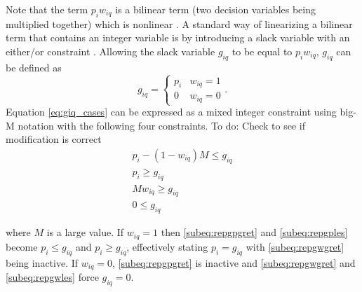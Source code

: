 \documentclass[letterpaper, 10pt, conference]{IEEEtran}
\newcommand{\TODO}[1]{{\color{green} To do: #1}}                                %
\begin{document}
Note that the term $p_i w_{iq}$ is a bilinear term (two decision variables being multiplied together) which is nonlinear
\cite{Rodriguez2013}. A standard way of linearizing a bilinear term that contains an integer variable is by introducing a slack variable with an either/or constraint \cite{Chen2010,Rodriguez2013}. Allowing
the slack variable $g_{iq}$ to be equal to $p_i w_{iq}$, $g_{iq}$ can be defined as
\begin{equation}
    \label{eq:giq_cases}
    g_{iq} =
    \begin{cases}
        p_i & w_{iq} = 1 \\
        0 & w_{iq} = 0
    \end{cases}.
\end{equation}
Equation \eqref{eq:giq_cases} can be expressed as a mixed integer constraint using big-M notation with the following four constraints. \TODO{Check to see if modification is correct}
\begin{subequations}
    \label{eq:slack_gain}
\begin{align}
    p_i - (1 - w_{iq})M \leq g_{iq}  \label{subeq:repgpgret} \\
    p_i \geq g_{iq}                 \label{subeq:repgples} \\
    Mw_{iq} \geq g_{iq}              \label{subeq:repgwgret} \\
    0 \leq g_{iq}                   \label{subeq:repgwles}
\end{align}
\end{subequations}

\noindent
where $M$ is a large value. If $w_{iq} = 1$ then \eqref{subeq:repgpgret} and \eqref{subeq:repgples} become $p_i \leq g_{iq}$ and $p_i \geq g_{iq}$, effectively stating $p_i = g_{iq}$ with \eqref{subeq:repgwgret} being inactive.
If $w_{iq} = 0$, \eqref{subeq:repgpgret} is inactive and \eqref{subeq:repgwgret} and \eqref{subeq:repgwles} force $g_{iq} = 0$.
\end{document}
